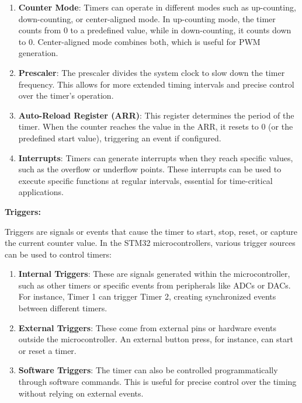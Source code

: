 \documentclass[10pt,a4paper,onecolumn]{article}
\begin{document}
\begin{enumerate}
\def\labelenumi{\arabic{enumi}.}
\item
  \textbf{Counter Mode}: Timers can operate in different modes such as
  up-counting, down-counting, or center-aligned mode. In up-counting
  mode, the timer counts from 0 to a predefined value, while in
  down-counting, it counts down to 0. Center-aligned mode combines both,
  which is useful for PWM generation.
\item
  \textbf{Prescaler}: The prescaler divides the system clock to slow
  down the timer frequency. This allows for more extended timing
  intervals and precise control over the timer's operation.
\item
  \textbf{Auto-Reload Register (ARR)}: This register determines the
  period of the timer. When the counter reaches the value in the ARR, it
  resets to 0 (or the predefined start value), triggering an event if
  configured.
\item
  \textbf{Interrupts}: Timers can generate interrupts when they reach
  specific values, such as the overflow or underflow points. These
  interrupts can be used to execute specific functions at regular
  intervals, essential for time-critical applications.
\end{enumerate}

\textbf{Triggers:}

Triggers are signals or events that cause the timer to start, stop,
reset, or capture the current counter value. In the STM32
microcontrollers, various trigger sources can be used to control timers:

\begin{enumerate}
\def\labelenumi{\arabic{enumi}.}
\item
  \textbf{Internal Triggers}: These are signals generated within the
  microcontroller, such as other timers or specific events from
  peripherals like ADCs or DACs. For instance, Timer 1 can trigger Timer
  2, creating synchronized events between different timers.
\item
  \textbf{External Triggers}: These come from external pins or hardware
  events outside the microcontroller. An external button press, for
  instance, can start or reset a timer.
\item
  \textbf{Software Triggers}: The timer can also be controlled
  programmatically through software commands. This is useful for precise
  control over the timing without relying on external events.
\end{enumerate}
\end{document}
